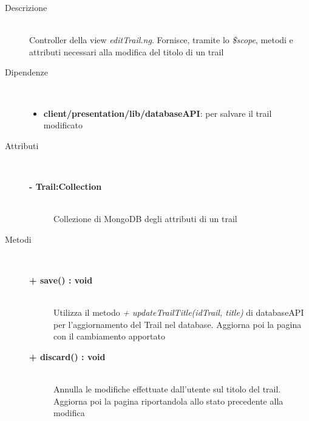 \begin{description}
\item[Descrizione] \hfill \\
	Controller della view \textit{editTrail.ng}. Fornisce, tramite lo \textit{\$scope}, metodi e attributi necessari alla modifica del titolo di un trail
	
	
\item[Dipendenze] \hfill \\
	\begin{itemize}
		\item \textbf{client/presentation/lib/databaseAPI}: per salvare il trail modificato
	\end{itemize}
	
	
\item[Attributi] \hfill \\
	\begin{description}
		\item[\textbf{- Trail:Collection			}] \hfill \\
			Collezione di MongoDB degli attributi di un trail
	\end{description}
	
\item[Metodi] \hfill \\

	\begin{description}
		\item[\textbf{\color{blue}+ save() : void			}] \hfill \\
			Utilizza il metodo \textit{+ updateTrailTitle(idTrail, title)} di databaseAPI per l'aggiornamento del Trail nel database. Aggiorna poi la pagina con il cambiamento apportato
	\end{description}
	
	\begin{description}
		\item[\textbf{\color{blue}+ discard() : void			}] \hfill \\
			Annulla le modifiche effettuate dall'utente sul titolo del trail. Aggiorna poi la pagina riportandola allo stato precedente alla modifica
	\end{description}

	
\end{description}



